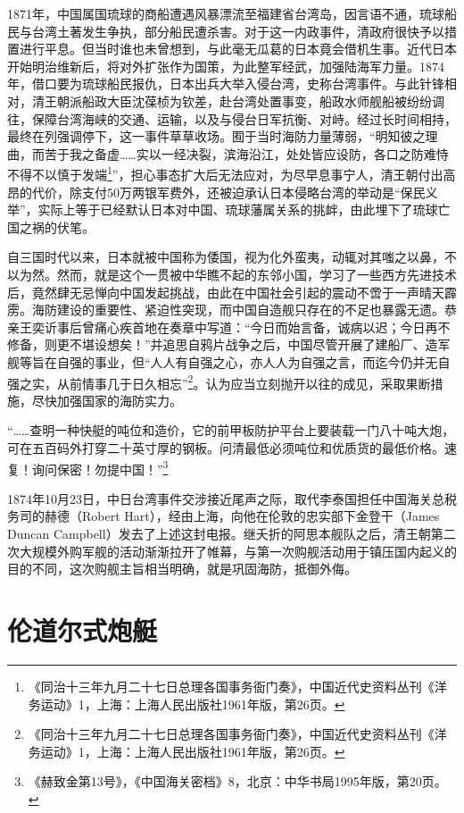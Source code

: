 \documentclass[12pt,UTF8]{ctexbook}
\begin{document}
1871年，中国属国琉球的商船遭遇风暴漂流至福建省台湾岛，因言语不通，琉球船民与台湾土著发生争执，部分船民遭杀害。对于这一内政事件，清政府很快予以措置进行平息。但当时谁也未曾想到，与此毫无瓜葛的日本竟会借机生事。近代日本开始明治维新后，将对外扩张作为国策，为此整军经武，加强陆海军力量。1874年，借口要为琉球船民报仇，日本出兵大举入侵台湾，史称台湾事件。与此针锋相对，清王朝派船政大臣沈葆桢为钦差，赴台湾处置事变，船政水师舰船被纷纷调往，保障台湾海峡的交通、运输，以及与侵台日军抗衡、对峙。经过长时间相持，最终在列强调停下，这一事件草草收场。囿于当时海防力量薄弱，“明知彼之理曲，而苦于我之备虚……实以一经决裂，滨海沿江，处处皆应设防，各口之防难恃不得不以慎于发端\footnote{《同治十三年九月二十七日总理各国事务衙门奏》，中国近代史资料丛刊《洋务运动》1，上海：上海人民出版社1961年版，第26页。}”，担心事态扩大后无法应对，为尽早息事宁人，清王朝付出高昂的代价，除支付50万两银军费外，还被迫承认日本侵略台湾的举动是“保民义举”，实际上等于已经默认日本对中国、琉球藩属关系的挑衅，由此埋下了琉球亡国之祸的伏笔。

自三国时代以来，日本就被中国称为倭国，视为化外蛮夷，动辄对其嗤之以鼻，不以为然。然而，就是这个一贯被中华瞧不起的东邻小国，学习了一些西方先进技术后，竟然肆无忌惮向中国发起挑战，由此在中国社会引起的震动不啻于一声晴天霹雳。海防建设的重要性、紧迫性突现，而中国自造舰只存在的不足也暴露无遗。恭亲王奕䜣事后曾痛心疾首地在奏章中写道：“今日而始言备，诚病以迟；今日再不修备，则更不堪设想矣！”并追思自鸦片战争之后，中国尽管开展了建船厂、造军舰等旨在自强的事业，但“人人有自强之心，亦人人为自强之言，而迄今仍并无自强之实，从前情事几于日久相忘”\footnote{《同治十三年九月二十七日总理各国事务衙门奏》，中国近代史资料丛刊《洋务运动》1，上海：上海人民出版社1961年版，第26页。}。认为应当立刻抛开以往的成见，采取果断措施，尽快加强国家的海防实力。

“……查明一种快艇的吨位和造价，它的前甲板防护平台上要装载一门八十吨大炮，可在五百码外打穿二十英寸厚的钢板。问清最低必须吨位和优质货的最低价格。速复！询问保密！勿提中国！”\footnote{《赫致金第13号》，《中国海关密档》8，北京：中华书局1995年版，第20页。}

1874年10月23日，中日台湾事件交涉接近尾声之际，取代李泰国担任中国海关总税务司的赫德（Robert Hart），经由上海，向他在伦敦的忠实部下金登干（James Duncan Campbell）发去了上述这封电报。继夭折的阿思本舰队之后，清王朝第二次大规模外购军舰的活动渐渐拉开了帷幕，与第一次购舰活动用于镇压国内起义的目的不同，这次购舰主旨相当明确，就是巩固海防，抵御外侮。

\section{伦道尔式炮艇}
\end{document}

